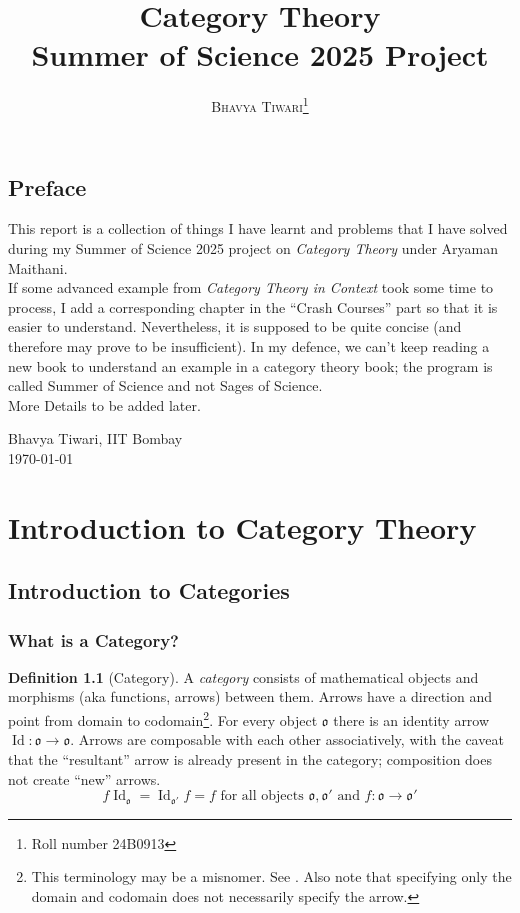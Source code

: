 \documentclass{scrbook}
\author{\textsc{Bhavya Tiwari}\thanks{Roll number \textsc{24B0913}}}
\title{Category Theory \\[5mm]
\Large Summer of Science 2025 Project}
\theoremstyle{definition}\newtheorem{defn}{Definition}
\theoremstyle{definition}\newtheorem*{rmk}{Remark}
\newcommand{\Chapter}[1]{\chapter*{#1}\addcontentsline{toc}{chapter}{#1}}
\DeclareMathOperator{\Id}{Id}
\begin{document}
\maketitle
\tableofcontents

\Chapter{Preface}

This report is a collection of things I have learnt and problems that I have
solved during my Summer of Science 2025 project on \emph{Category Theory} under
Aryaman Maithani.
\\[2mm]
If some advanced example from \emph{Category Theory in Context} took some time
to process, I add a corresponding chapter in the ``Crash Courses'' part so that
it is easier to understand. Nevertheless, it is supposed to be quite concise
(and therefore may prove to be insufficient). In my defence,
we can't keep reading a new book to understand an example in a category theory
book; the program is called Summer of Science and not Sages of Science.
\\[2mm]
More Details to be added later.

\bigskip\noindent
Bhavya Tiwari, IIT Bombay \\
\monthyear\today

\part{Introduction to Category Theory}

\chapter{Introduction to Categories}

\section{What is a Category?}

\begin{defn}[Category]
  A \emph{category} consists of mathematical objects and morphisms (aka
  functions, arrows) between them.  Arrows have a direction and point from
  domain to codomain\footnote{This terminology may be a misnomer. See
    . Also note that specifying only the domain and
  codomain does not necessarily specify the arrow.}. For every object $\mathfrak
  o$ there is an identity arrow $\Id: \mathfrak o \to \mathfrak o$. Arrows are
  composable with each other associatively, with the caveat that the ``resultant'' arrow is
  already present in the category; composition does not create ``new'' arrows. 
  \[ f\Id_{\mathfrak o} = \Id_{\mathfrak o'}f = f \text{ for all objects
  }\mathfrak o, \mathfrak o' \text{ and }f : \mathfrak o \to \mathfrak o'\]
\end{defn}
\end{document}

